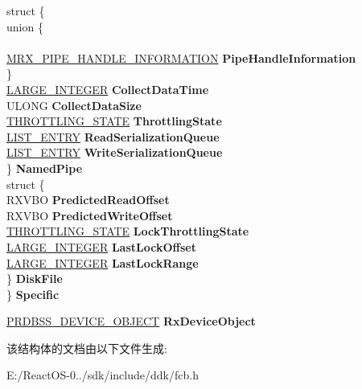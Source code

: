 \begin{DoxyCompactItemize}
\begin{tabbing}
\>struct \{\\
\mbox{\label{struct___f_o_b_x_1_1_0D1596_1_1_0D1599_ae3bed35e89c8cd2ca71508d0431d5fe1}} 
\>\>union \{\\
\>\>\\
\>\>\>\hyperlink{struct___m_r_x___p_i_p_e___h_a_n_d_l_e___i_n_f_o_r_m_a_t_i_o_n}{MRX\_PIPE\_HANDLE\_INFORMATION} {\bfseries PipeHandleInformation}\\
\>\>\} \\
\>\>\hyperlink{union___l_a_r_g_e___i_n_t_e_g_e_r}{LARGE\_INTEGER} {\bfseries CollectDataTime}\\
\>\>ULONG {\bfseries CollectDataSize}\\
\>\>\hyperlink{struct___t_h_r_o_t_t_l_i_n_g___s_t_a_t_e}{THROTTLING\_STATE} {\bfseries ThrottlingState}\\
\>\>\hyperlink{struct___l_i_s_t___e_n_t_r_y}{LIST\_ENTRY} {\bfseries ReadSerializationQueue}\\
\>\>\hyperlink{struct___l_i_s_t___e_n_t_r_y}{LIST\_ENTRY} {\bfseries WriteSerializationQueue}\\
\>\} {\bfseries NamedPipe}\\
\>struct \{\\
\>\>RXVBO {\bfseries PredictedReadOffset}\\
\>\>RXVBO {\bfseries PredictedWriteOffset}\\
\>\>\hyperlink{struct___t_h_r_o_t_t_l_i_n_g___s_t_a_t_e}{THROTTLING\_STATE} {\bfseries LockThrottlingState}\\
\>\>\hyperlink{union___l_a_r_g_e___i_n_t_e_g_e_r}{LARGE\_INTEGER} {\bfseries LastLockOffset}\\
\>\>\hyperlink{union___l_a_r_g_e___i_n_t_e_g_e_r}{LARGE\_INTEGER} {\bfseries LastLockRange}\\
\>\} {\bfseries DiskFile}\\
\} {\bfseries Specific}\\

\end{tabbing}\item 
\mbox{\label{struct___f_o_b_x_aef786762585b250c890a4b10fe407947}} 
\hyperlink{struct___r_d_b_s_s___d_e_v_i_c_e___o_b_j_e_c_t}{P\+R\+D\+B\+S\+S\+\_\+\+D\+E\+V\+I\+C\+E\+\_\+\+O\+B\+J\+E\+CT} {\bfseries Rx\+Device\+Object}
\end{DoxyCompactItemize}


该结构体的文档由以下文件生成\+:\begin{DoxyCompactItemize}
\item 
E\+:/\+React\+O\+S-\/0../sdk/include/ddk/fcb.\+h\end{DoxyCompactItemize}
